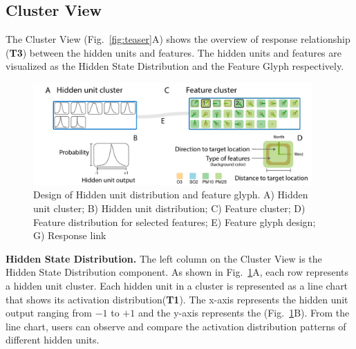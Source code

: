 \subsection{Cluster View}

The Cluster View (Fig.~\ref{fig:teaser}A) shows the overview of response relationship (\textbf{T3}) between the hidden units and features. The hidden units and features are visualized as the Hidden State Distribution and the Feature Glyph respectively.


\begin{figure}[t]
	\centering
    \includegraphics[width=0.95\textwidth]{figure/MultiRNNExplorer/design/cluster_design.pdf}
	\vspace{-3mm}
	\caption{Design of Hidden unit distribution and feature glyph. A) Hidden unit cluster; B) Hidden unit distribution; C) Feature cluster; D) Feature distribution for selected features; E) Feature glyph design; G) Response link}
	\label{fig:cluster_design}
	\vspace{-4mm}
\end{figure}


\textbf{Hidden State Distribution.}
The left column on the Cluster View is the Hidden State Distribution component.
As shown in Fig.~\ref{fig:cluster_design}A, each row represents a hidden unit cluster.
Each hidden unit in a cluster is represented as a line chart that shows its activation distribution(\textbf{T1}).
The x-axis represents the hidden unit output ranging from $-1$ to $+1$ and the y-axis represents the  (Fig.~\ref{fig:cluster_design}B).
From the line chart, users can observe and compare the activation distribution patterns of different hidden units. 

